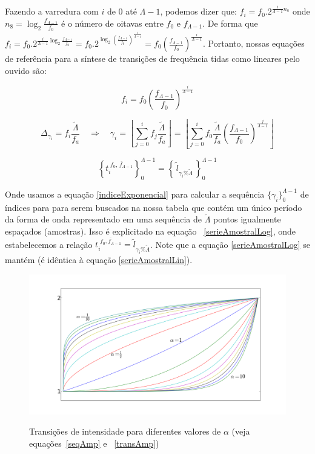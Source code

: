 Fazendo a varredura com $i$
de $0$ até $\Lambda-1$, podemos dizer que: $f_i=f_0 . 2^{\frac{i}{\Lambda-1} n_8}$ onde 
$n_8=\log_2\frac{f_{\Lambda-1}}{f_0}$ é o número de oitavas entre $f_0$ e $f_{\Lambda-1}$.
De forma que $f_i=f_0 . 2^{\frac{i}{\Lambda-1}\log_2\frac{f_{\Lambda-1}}{f_0}}=
f_0 . 2^{\log_2\left ( \frac{f_{\Lambda-1}}{f_0} \right )^{\frac{i}{\Lambda-1}}}=
f_0 \left ( \frac{f_{\Lambda-1}}{f_0} \right ) ^{\frac{i}{\Lambda -1}}$. Portanto,
nossas equações de referência para a síntese de transições de frequência tidas como
lineares pelo ouvido são:

\begin{equation}
f_i=f_0 \left ( \frac{f_{\Lambda-1}}{f_0} \right ) ^{\frac{i}{\Lambda -1}}
\end{equation}

\begin{equation}\label{indiceExponencial}
\Delta_{\gamma_i}=f_i\frac{\widetilde{\Lambda}}{f_a} \quad \Rightarrow \quad \gamma_i=\left \lfloor \sum_{j=0}^{i} f_j\frac{\widetilde{\Lambda}}{f_a} \right \rfloor   =\left \lfloor \sum_{j=0}^{i} f_0 \frac{\widetilde{\Lambda}}{f_a} \left ( \frac{f_{\Lambda-1}}{f_0} \right ) ^{\frac{j}{\Lambda -1}} \right \rfloor
\end{equation}

\begin{equation}\label{serieAmostralLog}
\left\{t_i^{\;\overline{f_0,\,f_{\Lambda-1}}}\right\}_0^{\Lambda-1}=\left\{\,\widetilde{l}_{\gamma_i \% \widetilde{\Lambda}}\,\right\}_0^{\Lambda-1}
\end{equation}

Onde usamos a equação \ref{indiceExponencial} para calcular a sequência $\{\gamma_i\}_0^{\Lambda-1}$ de índices para para
serem buscados na nossa tabela que contém um único período da forma de onda representado em uma sequência de $\widetilde{\Lambda}$
pontos igualmente espaçados (amostras).
Isso é explicitado na equação ~\ref{serieAmostralLog}, onde estabelecemos a relação
 $t_i^{\;\overline{f_0,f_{\Lambda-1}}}=\widetilde{l}_{\gamma_i \% \widetilde{\Lambda}}$.
Note que a equação \ref{serieAmostralLog} se mantém (é idêntica à equação \ref{serieAmostralLin}).

\begin{figure}[h!]
    \centering
    \caption{Transições de intensidade para diferentes valores de $\alpha$ (veja equações~\ref{seqAmp} e ~\ref{transAmp})}
        \includegraphics[width=\textwidth]{figuras/transicao}
        \label{fig:transicao}
\end{figure}


